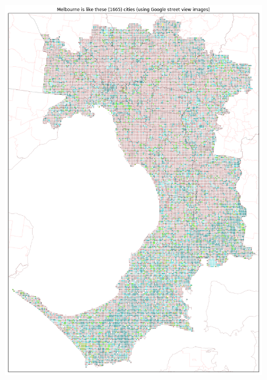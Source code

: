 \documentclass[sageh,times]{sagej}
\begin{document}
\begin{figure}[!htbp]
\centering    
\includegraphics[scale=0.20]{Images/MelbourneOverall_maps.png} 

\end{figure}
\end{document}
